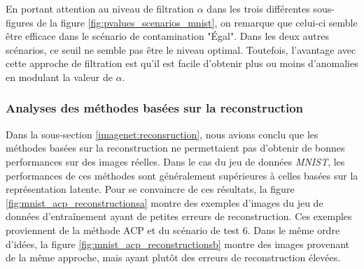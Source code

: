 En portant attention au niveau de filtration $\alpha$ dans les trois différentes sous-figures de la figure \ref{fig:pvalues_scenarios_mnist}, on remarque que celui-ci semble être efficace dans le scénario de contamination "Égal". Dans les deux autres scénarios, ce seuil ne semble pas être le niveau optimal. Toutefois, l'avantage avec cette approche de filtration est qu'il est facile d'obtenir plus ou moins d'anomalies en modulant la valeur de $\alpha$.

\subsubsection{Analyses des méthodes basées sur la reconstruction} \label{mnist:reconsruction}

Dans la sous-section \ref{imagenet:reconsruction}, nous avions conclu que les méthodes basées sur la reconstruction ne permettaient pas d'obtenir de bonnes performances sur des images réelles. Dans le cas du jeu de données \textit{MNIST}, les performances de ces méthodes sont généralement supérieures à celles basées sur la représentation latente. Pour se convaincre de ces résultats, la figure \ref{fig:mnist_acp_reconstructionsa} montre des exemples d'images du jeu de données d'entraînement ayant de petites erreurs de reconstruction. Ces exemples proviennent de la méthode ACP et du scénario de test 6.  Dans le même ordre d'idées, la figure \ref{fig:mnist_acp_reconstructionsb} montre des images provenant de la même approche, mais ayant plutôt des erreurs de reconstruction élevées. 

